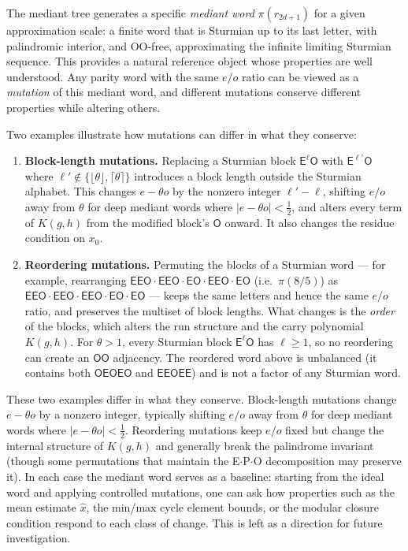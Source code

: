 \documentclass[12pt]{article}
\theoremstyle{definition}
\theoremstyle{remark}
\theoremstyle{plain}
\newcommand{\OO}{\mathsf{O}}
\newcommand{\EE}{\mathsf{E}}
\begin{document}
The mediant tree generates a specific \emph{mediant word} $\pi(r_{2d+1})$ for a given
approximation scale: a finite word that is Sturmian up to its last letter, with
palindromic interior, and OO-free, approximating the infinite limiting Sturmian sequence.
This provides a natural reference object whose properties are well understood.
Any parity word with the same $e/o$ ratio can be viewed as a \emph{mutation} of this
mediant word, and different mutations conserve different properties while altering
others.

Two examples illustrate how mutations can differ in what they conserve:

\begin{enumerate}
\item \textbf{Block-length mutations.}
  Replacing a Sturmian block $\EE^\ell\OO$ with $\EE^{\ell'}\OO$ where
  $\ell' \notin \{\lfloor\theta\rfloor, \lceil\theta\rceil\}$ introduces a
  block length outside the Sturmian alphabet.
  This changes $e - \theta o$ by the nonzero integer $\ell' - \ell$, shifting
  $e/o$ away from $\theta$ for deep mediant words where $|e - \theta o| < \frac{1}{2}$,
  and alters every term of $K(g,h)$ from the modified block's $\OO$ onward.
  It also changes the residue condition on $x_0$.

\item \textbf{Reordering mutations.}
  Permuting the blocks of a Sturmian word --- for example, rearranging
  $\EE\EE\OO\cdot\EE\EE\OO\cdot\EE\OO\cdot\EE\EE\OO\cdot\EE\OO$ (i.e.\
  $\pi(8/5)$) as $\EE\EE\OO\cdot\EE\EE\OO\cdot\EE\EE\OO\cdot\EE\OO\cdot\EE\OO$
  --- keeps the same letters and hence the same $e/o$ ratio, and preserves
  the multiset of block lengths.
  What changes is the \emph{order} of the blocks, which alters the run structure
  and the carry polynomial $K(g,h)$.
  For $\theta > 1$, every Sturmian block $\EE^\ell\OO$ has $\ell \geq 1$, so
  no reordering can create an $\OO\OO$ adjacency.
  The reordered word above is unbalanced (it contains both $\OO\EE\OO\EE\OO$
  and $\EE\EE\OO\EE\EE$) and is not a factor of any Sturmian word.
\end{enumerate}

These two examples differ in what they conserve.
Block-length mutations change $e - \theta o$ by a nonzero integer, typically
shifting $e/o$ away from $\theta$ for deep mediant words where $|e - \theta o| < \frac{1}{2}$.
Reordering mutations keep $e/o$ fixed but change the internal structure of $K(g,h)$
and generally break the palindrome invariant (though some permutations that maintain
the E$\cdot$P$\cdot$O decomposition may preserve it).
In each case the mediant word serves as a baseline:
starting from the ideal word and applying controlled mutations, one can ask how
properties such as the mean estimate $\hat{x}$, the min/max cycle element bounds,
or the modular closure condition respond to each class of change.
This is left as a direction for future investigation.
\end{document}
